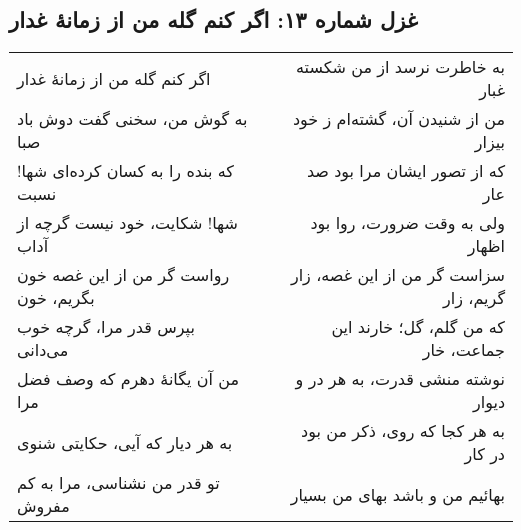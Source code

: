 \begin{center}
\section*{غزل شماره ۱۳: اگر کنم گله من از زمانهٔ غدار}
\label{sec:013}
\begin{longtable}{l p{0.5cm} r}
اگر کنم گله من از زمانهٔ غدار
&&
به خاطرت نرسد از من شکسته غبار
\\
به گوش من، سخنی گفت دوش باد صبا
&&
من از شنیدن آن، گشته‌ام ز خود بیزار
\\
که بنده را به کسان کرده‌ای شها! نسبت
&&
که از تصور ایشان مرا بود صد عار
\\
شها! شکایت، خود نیست گرچه از آداب
&&
ولی به وقت ضرورت، روا بود اظهار
\\
رواست گر من از این غصه خون بگریم، خون
&&
سزاست گر من از این غصه، زار گریم، زار
\\
بپرس قدر مرا، گرچه خوب می‌دانی
&&
که من گلم، گل؛ خارند این جماعت، خار
\\
من آن یگانهٔ دهرم که وصف فضل مرا
&&
نوشته منشی قدرت، به هر در و دیوار
\\
به هر دیار که آیی، حکایتی شنوی
&&
به هر کجا که روی، ذکر من بود در کار
\\
تو قدر من نشناسی، مرا به کم مفروش
&&
بهائیم من و باشد بهای من بسیار
\\
\end{longtable}
\end{center}
